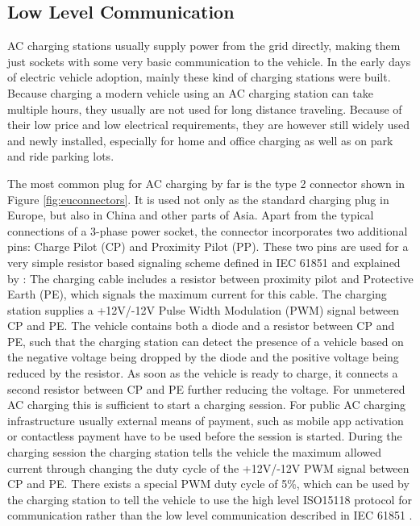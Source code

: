 \documentclass[conference,flushend]{iaria} %
\begin{document}
\subsection{Low Level Communication}
AC charging stations usually supply power from the grid directly, making them just sockets with some very basic communication to the vehicle.
In the early days of electric vehicle adoption, mainly these kind of charging stations were built.
Because charging a modern vehicle using an AC charging station can take multiple hours, they usually are not used for long distance traveling.
Because of their low price and low electrical requirements, they are however still widely used and newly installed, especially for home and office charging as well as on park and ride parking lots.

The most common plug for AC charging by far is the type 2 connector shown in Figure \ref{fig:euconnectors}. It is used not only as the standard charging plug in Europe, but also in China and other parts of Asia.
Apart from the typical connections of a 3-phase power socket, the connector incorporates two additional pins: Charge Pilot (CP) and Proximity Pilot (PP).
These two pins are used for a very simple resistor based signaling scheme defined in IEC 61851 \cite{iec_iec_2010} and explained by \cite{dalheimer_ladeinfrastruktur_2017}:
The charging cable includes a resistor between proximity pilot and Protective Earth (PE), which signals the maximum current for this cable.
The charging station supplies a +12V/-12V Pulse Width Modulation (PWM) signal between CP and PE.
The vehicle contains both a diode and a resistor between CP and PE, such that the charging station can detect the presence of a vehicle based on the negative voltage being dropped by the diode and the positive voltage being reduced by the resistor.
As soon as the vehicle is ready to charge, it connects a second resistor between CP and PE further reducing the voltage.
For unmetered AC charging this is sufficient to start a charging session.
For public AC charging infrastructure usually external means of payment, such as mobile app activation or contactless payment have to be used before the session is started.
During the charging session the charging station tells the vehicle the maximum allowed current through changing the duty cycle of the +12V/-12V PWM signal between CP and PE.
There exists a special PWM duty cycle of 5\%, which can be used by the charging station to tell the vehicle to use the high level ISO15118 protocol for communication rather than the low level communication described in IEC 61851 \cite{iec_iec_2010}.
\end{document}
